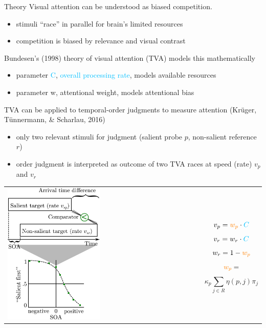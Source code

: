 \documentclass[a0paper,portrait]{baposter}
\begin{document}
\begin{poster}
\begin{posterbox}[name=theory,column=0,row=1,below=intro]{Theory}
Visual attention can be understood as biased competition.
	\begin{itemize}
	\item stimuli ``race'' in parallel for brain's limited resources 
    \item competition is biased by relevance and visual contrast
	\end{itemize}
Bundesen's (1998) theory of visual attention (TVA) models this mathematically
	\begin{itemize}
	\item parameter \textcolor{deepskyblue}{C}, \textcolor{deepskyblue}{overall processing rate}, models available resources 
    \item parameter \textcolor{orangec}{w}, \textcolor{orangec}{attentional weight}, models attentional bias
	\end{itemize}
TVA can be applied to temporal-order judgments to measure attention (Krüger, Tünnermann, \& Scharlau, 2016)
	\begin{itemize}
	\item only two relevant stimuli for judgment (salient probe $p$, non-salient reference $r$)
    \item order judgment is interpreted as outcome of two TVA races at speed (rate) $v_p$ and $v_r$
	\end{itemize}
\begin{tabular}{p{} p{}}
\vspace{0cm} \includegraphics[width=0.485\textwidth]{imgs/cogmod.pdf} & \vspace{0cm}
$$v_p = \textcolor{orangec}{w_p} \cdot \textcolor{deepskyblue}{C}$$
$$v_r = w_r \cdot \textcolor{deepskyblue}{C}$$
$$w_r = 1-\textcolor{orangec}{w_p}$$
$$\textcolor{orangec}{w_p} =$$ 
$$ \kappa_p \sum_{j \in R} \eta(p,j)\pi_j$$ \\
\end{tabular}


\end{posterbox}
\end{poster}
\end{document}
